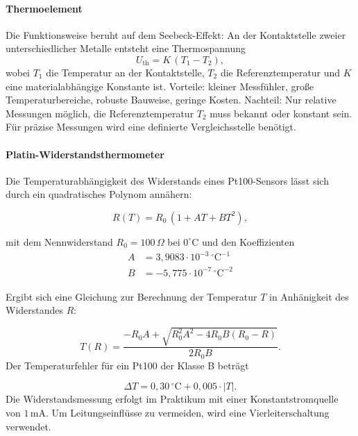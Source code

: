 \paragraph{Thermoelement}
Die Funktionsweise beruht auf dem Seebeck-Effekt: An der Kontaktstelle zweier unterschiedlicher Metalle entsteht eine Thermospannung
\begin{equation}
    U_{\mathrm{th}} = K \, (T_1 - T_2),
\end{equation}
wobei $T_1$ die Temperatur an der Kontaktstelle, $T_2$ die Referenztemperatur und $K$ eine materialabhängige Konstante ist.  
Vorteile: kleiner Messfühler, große Temperaturbereiche, robuste Bauweise, geringe Kosten.  
Nachteil: Nur relative Messungen möglich, die Referenztemperatur $T_2$ muss bekannt oder konstant sein. Für präzise Messungen wird eine definierte Vergleichsstelle benötigt.  

\paragraph{Platin-Widerstandsthermometer}
Die Temperaturabhängigkeit des Widerstands eines Pt100-Sensors lässt sich durch ein quadratisches Polynom annähern:

\begin{equation}
    R(T) = R_0 \,(1 + A T + B T^2),
\end{equation}

mit dem Nennwiderstand $R_0 = 100\,\Omega$ bei $0^\circ$C und den Koeffizienten 
\begin{align}
    A &= 3,9083 \cdot 10^{-3}\,\mathrm{^\circ C^{-1}} \\
    B &= -5,775 \cdot 10^{-7}\,\mathrm{^\circ C^{-2}}
\end{align}

Ergibt sich eine Gleichung zur Berechnung der Temperatur $T$ in Anhänigkeit des Widerstandes $R$:

\begin{equation}
    T(R) = \frac{-R_0A + \sqrt{R_0^2 A^2 - 4 R_0 B (R_0 - R)}}{2 R_0 B}.
    \label{eq:t_pt100}
\end{equation}
Der Temperaturfehler für ein Pt100 der Klasse B beträgt

\begin{equation}
    \Delta T = 0{,}30\,^\circ\mathrm{C} + 0{,}005 \cdot |T|.
\end{equation}
Die Widerstandsmessung erfolgt im Praktikum mit einer Konstantstromquelle von $1\,$mA. Um Leitungseinflüsse zu vermeiden, wird eine Vierleiterschaltung verwendet.

